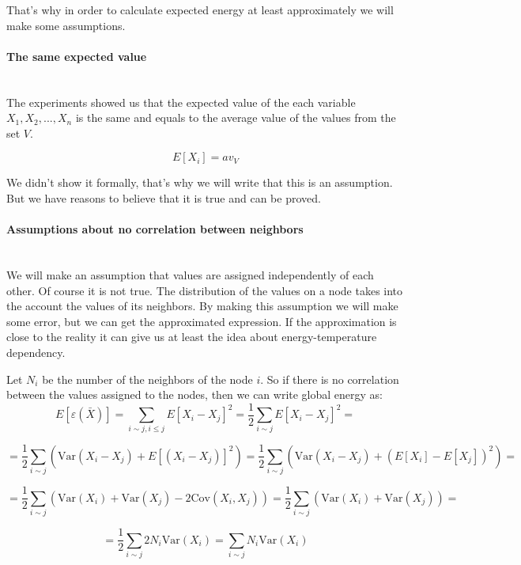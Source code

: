 \documentclass[12pt]{report}
\begin{document}
That's why in order to calculate expected energy at least approximately we will make some assumptions.

\paragraph{The same expected value}
\mbox{} \\

The experiments showed us that the expected value of the each variable $X_1, X_2, ..., X_n$ is the same and equals to the average value of the values from the set $V$. 

$$E[X_i] = av_V$$

We didn't show it formally, that's why we will write that this is an assumption. But we have reasons to believe that it is true and can be proved.
\paragraph{Assumptions about no correlation between neighbors}
\mbox{} \\

We will make an assumption that values are assigned independently of each other. Of course it is not true. The distribution of the values on a node takes into the account the values of its neighbors. By making this assumption we will make some error, but we can get the approximated expression. If the approximation is close to the reality it can give us at least the idea about energy-temperature dependency.

 Let $N_i$ be the number of the neighbors of the node $i$. So if there is no correlation between the values assigned to the nodes, then we can write global energy as:
$$ E[\varepsilon (\bar{X})] =  \sum_{i \sim j, i \leq j} E[X_i - X_j]^2 = 
\frac{1}{2} \sum_{i \sim j} E[X_i - X_j]^2 = $$

$$ = \frac{1}{2} \sum_{i \sim j} \left(\mathrm{Var}(X_i - X_j) + E[(X_i - X_j)]^2 \right) 
= \frac{1}{2} \sum_{i \sim j} \left(\mathrm{Var}(X_i - X_j) + (E[X_i] - E[X_j])^2 \right) = 
$$


$$ = \frac{1}{2} \sum_{i \sim j} \left(\mathrm{Var}(X_i) + \mathrm{Var}(X_j) - 2\mathrm{Cov}(X_i, X_j) \right) = \frac{1}{2} \sum_{i \sim j} \left(\mathrm{Var}(X_i) + \mathrm{Var}(X_j) \right)=
$$

\begin{equation}
\label{eq:noCorr}
 = \frac{1}{2} \sum_{i \sim j} 2N_i\mathrm{Var}(X_i) 
= \sum_{i \sim j} N_i\mathrm{Var}(X_i)  
\end{equation}
\end{document}
